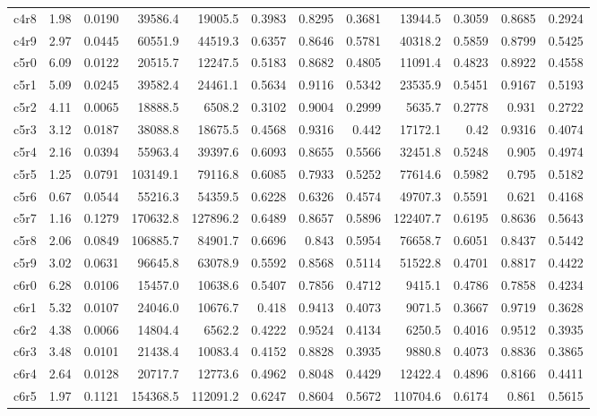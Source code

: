 \begin{landscape}
\begin{longtable}[]{@{}lrrrrrrrrrrr@{}}
c4r8 & 1.98 & 0.0190 & 39586.4 & 19005.5 & 0.3983 & 0.8295 & 0.3681 & 13944.5 & 0.3059 & 0.8685 & 0.2924 \\
c4r9 & 2.97 & 0.0445 & 60551.9 & 44519.3 & 0.6357 & 0.8646 & 0.5781 & 40318.2 & 0.5859 & 0.8799 & 0.5425 \\
c5r0 & 6.09 & 0.0122 & 20515.7 & 12247.5 & 0.5183 & 0.8682 & 0.4805 & 11091.4 & 0.4823 & 0.8922 & 0.4558 \\
c5r1 & 5.09 & 0.0245 & 39582.4 & 24461.1 & 0.5634 & 0.9116 & 0.5342 & 23535.9 & 0.5451 & 0.9167 & 0.5193 \\
c5r2 & 4.11 & 0.0065 & 18888.5 & 6508.2 & 0.3102 & 0.9004 & 0.2999 & 5635.7 & 0.2778 & 0.931 & 0.2722 \\
c5r3 & 3.12 & 0.0187 & 38088.8 & 18675.5 & 0.4568 & 0.9316 & 0.442 & 17172.1 & 0.42 & 0.9316 & 0.4074 \\
c5r4 & 2.16 & 0.0394 & 55963.4 & 39397.6 & 0.6093 & 0.8655 & 0.5566 & 32451.8 & 0.5248 & 0.905 & 0.4974 \\
c5r5 & 1.25 & 0.0791 & 103149.1 & 79116.8 & 0.6085 & 0.7933 & 0.5252 & 77614.6 & 0.5982 & 0.795 & 0.5182 \\
c5r6 & 0.67 & 0.0544 & 55216.3 & 54359.5 & 0.6228 & 0.6326 & 0.4574 & 49707.3 & 0.5591 & 0.621 & 0.4168 \\
c5r7 & 1.16 & 0.1279 & 170632.8 & 127896.2 & 0.6489 & 0.8657 & 0.5896 & 122407.7 & 0.6195 & 0.8636 & 0.5643 \\
c5r8 & 2.06 & 0.0849 & 106885.7 & 84901.7 & 0.6696 & 0.843 & 0.5954 & 76658.7 & 0.6051 & 0.8437 & 0.5442 \\
c5r9 & 3.02 & 0.0631 & 96645.8 & 63078.9 & 0.5592 & 0.8568 & 0.5114 & 51522.8 & 0.4701 & 0.8817 & 0.4422 \\
c6r0 & 6.28 & 0.0106 & 15457.0 & 10638.6 & 0.5407 & 0.7856 & 0.4712 & 9415.1 & 0.4786 & 0.7858 & 0.4234 \\
c6r1 & 5.32 & 0.0107 & 24046.0 & 10676.7 & 0.418 & 0.9413 & 0.4073 & 9071.5 & 0.3667 & 0.9719 & 0.3628 \\
c6r2 & 4.38 & 0.0066 & 14804.4 & 6562.2 & 0.4222 & 0.9524 & 0.4134 & 6250.5 & 0.4016 & 0.9512 & 0.3935 \\
c6r3 & 3.48 & 0.0101 & 21438.4 & 10083.4 & 0.4152 & 0.8828 & 0.3935 & 9880.8 & 0.4073 & 0.8836 & 0.3865 \\
c6r4 & 2.64 & 0.0128 & 20717.7 & 12773.6 & 0.4962 & 0.8048 & 0.4429 & 12422.4 & 0.4896 & 0.8166 & 0.4411 \\
c6r5 & 1.97 & 0.1121 & 154368.5 & 112091.2 & 0.6247 & 0.8604 & 0.5672 & 110704.6 & 0.6174 & 0.861 & 0.5615 \\

\end{longtable}
\end{landscape}
